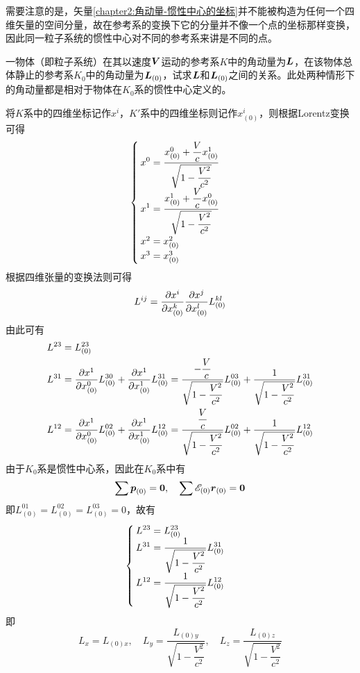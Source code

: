 需要注意的是，矢量\eqref{chapter2:角动量-惯性中心的坐标}并不能被构造为任何一个四维矢量的空间分量，故在参考系的变换下它的分量并不像一个点的坐标那样变换，因此同一粒子系统的惯性中心对不同的参考系来讲是不同的点。

\begin{example}
一物体（即粒子系统）在其以速度$\boldsymbol{V}$运动的参考系$K$中的角动量为$\boldsymbol{L}$，在该物体总体静止的参考系$K_0$中的角动量为$\boldsymbol{L}_{(0)}$，试求$\boldsymbol{L}$和$\boldsymbol{L}_{(0)}$之间的关系。此处两种情形下的角动量都是相对于物体在$K_0$系的惯性中心定义的。
\end{example}
\begin{solution}
将$K$系中的四维坐标记作$x^i$，$K'$系中的四维坐标则记作$x^i_{(0)}$，则根据Lorentz变换可得
\begin{equation*}
\begin{cases}
	\displaystyle x^0 = \frac{x^0_{(0)}+\dfrac{V}{c}x^1_{(0)}}{\sqrt{1-\dfrac{V^2}{c^2}}} \\
	\displaystyle x^1 = \frac{x^1_{(0)}+\dfrac{V}{c}x^0_{(0)}}{\sqrt{1-\dfrac{V^2}{c^2}}} \\
	x^2 = x^2_{(0)} \\
	x^3 = x^3_{(0)}
\end{cases}
\end{equation*}
根据四维张量的变换法则可得
\begin{equation*}
	L^{ij} = \frac{\partial x^i}{\partial x^k_{(0)}} \frac{\partial x^j}{\partial x^l_{(0)}} L^{kl}_{(0)}
\end{equation*}
由此可有
\begin{align*}
	L^{23} & = L^{23}_{(0)} \\
	L^{31} & = \frac{\partial x^1}{\partial x^0_{(0)}} L^{30}_{(0)} + \frac{\partial x^1}{\partial x^1_{(0)}} L^{31}_{(0)} = \frac{-\dfrac{V}{c}}{\sqrt{1-\dfrac{V^2}{c^2}}} L^{03}_{(0)} + \frac{1}{\sqrt{1-\dfrac{V^2}{c^2}}} L^{31}_{(0)} \\
	L^{12} & = \frac{\partial x^1}{\partial x^0_{(0)}} L^{02}_{(0)} + \frac{\partial x^1}{\partial x^1_{(0)}} L^{12}_{(0)} = \frac{\dfrac{V}{c}}{\sqrt{1-\dfrac{V^2}{c^2}}} L^{02}_{(0)} + \frac{1}{\sqrt{1-\dfrac{V^2}{c^2}}} L^{12}_{(0)}
\end{align*}
由于$K_0$系是惯性中心系，因此在$K_0$系中有
\begin{equation*}
	\sum \boldsymbol{p}_{(0)} = \boldsymbol{0},\quad \sum \mathscr{E}_{(0)}\boldsymbol{r}_{(0)} = \boldsymbol{0}
\end{equation*}
即$L^{01}_{(0)} = L^{02}_{(0)} = L^{03}_{(0)} = 0$，故有
\begin{equation*}
\begin{cases}
	\displaystyle L^{23} = L^{23}_{(0)} \\
	\displaystyle L^{31} = \frac{1}{\sqrt{1-\dfrac{V^2}{c^2}}} L^{31}_{(0)} \\
	\displaystyle L^{12} = \frac{1}{\sqrt{1-\dfrac{V^2}{c^2}}} L^{12}_{(0)}
\end{cases}
\end{equation*}
即
\begin{equation*}
	L_x = L_{(0)x},\quad L_y = \frac{L_{(0)y}}{\sqrt{1-\dfrac{V^2}{c^2}}} ,\quad L_z = \frac{L_{(0)z}}{\sqrt{1-\dfrac{V^2}{c^2}}}
\end{equation*}
\end{solution}